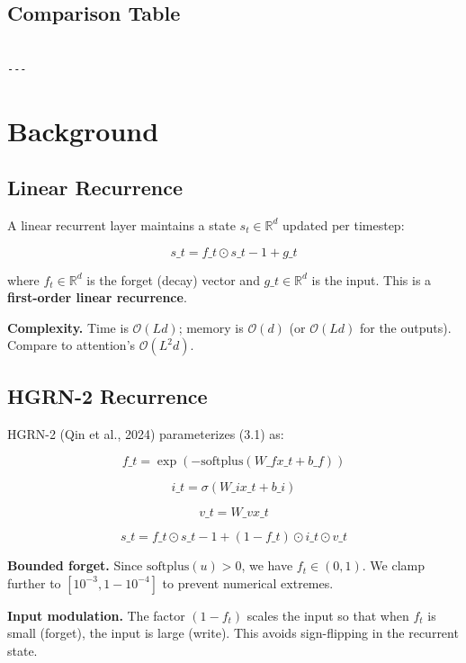 \subsection{Comparison Table}

\begin{lstlisting}

---
\end{lstlisting}

\section{Background}

\subsection{Linear Recurrence}

A linear recurrent layer maintains a state $s_t \in \mathbb{R}^d$ updated 
per timestep:

\[
s\_t = f\_t \odot s\_{t-1} + g\_t
\tag{3.1}
\]

where $f_t \in \mathbb{R}^d$ is the forget (decay) vector and $g\_t \in 
\mathbb{R}^d$ is the input. This is a \textbf{first-order linear recurrence}.

\textbf{Complexity.} Time is $\mathcal{O}(L d)$; memory is $\mathcal{O}(d)$ (or 
$\mathcal{O}(L d)$ for the outputs). Compare to attention's $\mathcal{O}(L^2 d)$.

\subsection{HGRN-2 Recurrence}

HGRN-2 (Qin et al., 2024) parameterizes (3.1) as:

\[
f\_t = \exp(-\text{softplus}(W\_f x\_t + b\_f))
\tag{3.2}
\]

\[
i\_t = \sigma(W\_i x\_t + b\_i)
\tag{3.3}
\]

\[
v\_t = W\_v x\_t
\tag{3.4}
\]

\[
s\_t = f\_t \odot s\_{t-1} + (1 - f\_t) \odot i\_t \odot v\_t
\tag{3.5}
\]

\textbf{Bounded forget.} Since $\text{softplus}(u) > 0$, we have $f_t \in (0, 1)$. 
We clamp further to $[10^{-3}, 1 - 10^{-4}]$ to prevent numerical extremes.

\textbf{Input modulation.} The factor $(1 - f_t)$ scales the input so that when 
$f_t$ is small (forget), the input is large (write). This avoids sign-flipping 
in the recurrent state.

